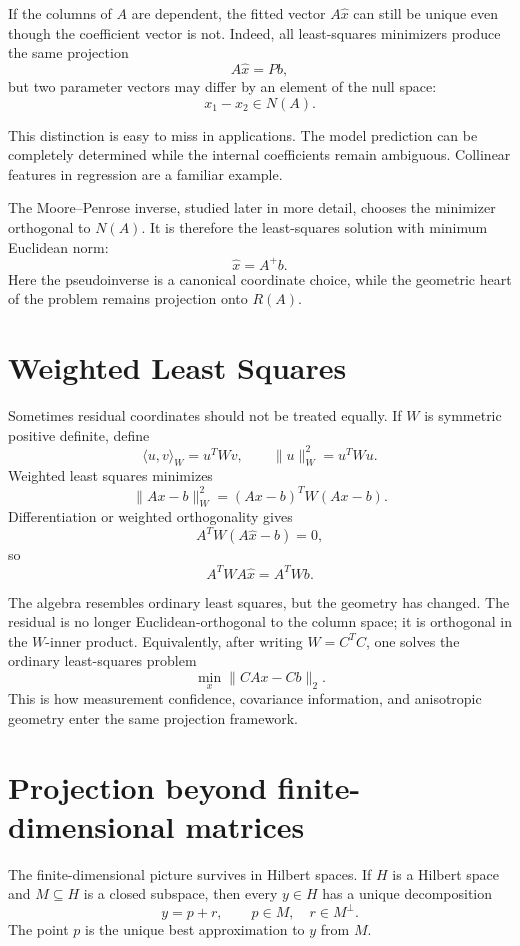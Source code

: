 If the columns of \(A\) are dependent, the fitted vector \(A\widehat x\) can still be unique even though the coefficient vector is not.  Indeed, all least-squares minimizers produce the same projection
\[
  A\widehat x=Pb,
\]
but two parameter vectors may differ by an element of the null space:
\[
  x_1-x_2\in N(A).
\]

This distinction is easy to miss in applications.  The model prediction can be completely determined while the internal coefficients remain ambiguous.  Collinear features in regression are a familiar example.

The Moore--Penrose inverse, studied later in more detail, chooses the minimizer orthogonal to \(N(A)\).  It is therefore the least-squares solution with minimum Euclidean norm:
\[
  \widehat x=A^+b.
\]
Here the pseudoinverse is a canonical coordinate choice, while the geometric heart of the problem remains projection onto \(R(A)\).

\section{Weighted Least Squares}

Sometimes residual coordinates should not be treated equally.  If \(W\) is symmetric positive definite, define
\[
  \langle u,v\rangle_W=u^TWv,
  \qquad
  \|u\|_W^2=u^TWu.
\]
Weighted least squares minimizes
\[
  \|Ax-b\|_W^2=(Ax-b)^TW(Ax-b).
\]
Differentiation or weighted orthogonality gives
\[
  A^TW(A\widehat x-b)=0,
\]
so
\[
  A^TWA\widehat x=A^TWb.
\]

The algebra resembles ordinary least squares, but the geometry has changed.  The residual is no longer Euclidean-orthogonal to the column space; it is orthogonal in the \(W\)-inner product.  Equivalently, after writing \(W=C^TC\), one solves the ordinary least-squares problem
\[
  \min_x\|CAx-Cb\|_2.
\]
This is how measurement confidence, covariance information, and anisotropic geometry enter the same projection framework.

\section{Projection beyond finite-dimensional matrices}

The finite-dimensional picture survives in Hilbert spaces.  If \(H\) is a Hilbert space and \(M\subseteq H\) is a closed subspace, then every \(y\in H\) has a unique decomposition
\[
  y=p+r,
  \qquad
  p\in M,\quad r\in M^\perp.
\]
The point \(p\) is the unique best approximation to \(y\) from \(M\).

